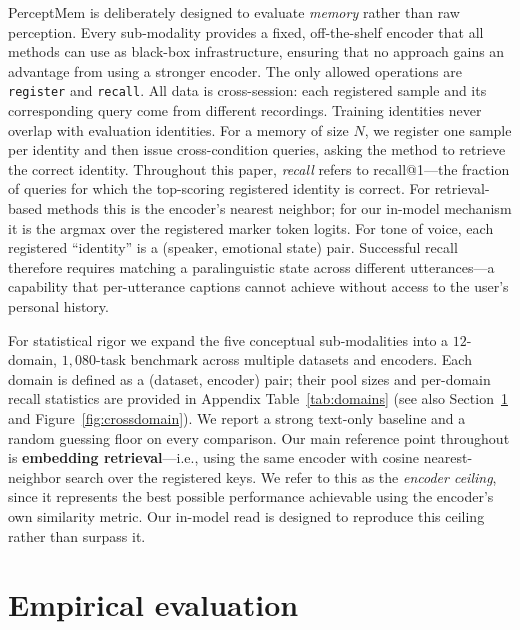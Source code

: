 PerceptMem is deliberately designed to evaluate \emph{memory} rather than raw perception. Every sub-modality provides a fixed, off-the-shelf encoder that all methods can use as black-box infrastructure, ensuring that no approach gains an advantage from using a stronger encoder. The only allowed operations are \texttt{register} and \texttt{recall}. All data is cross-session: each registered sample and its corresponding query come from different recordings. Training identities never overlap with evaluation identities. For a memory of size $N$, we register one sample per identity and then issue cross-condition queries, asking the method to retrieve the correct identity. Throughout this paper, \emph{recall} refers to recall@1---the fraction of queries for which the top-scoring registered identity is correct. For retrieval-based methods this is the encoder's nearest neighbor; for our in-model mechanism it is the argmax over the registered marker token logits. For tone of voice, each registered ``identity'' is a (speaker, emotional state) pair. Successful recall therefore requires matching a paralinguistic state across different utterances---a capability that per-utterance captions cannot achieve without access to the user's personal history.

For statistical rigor we expand the five conceptual sub-modalities into a $12$-domain, $1{,}080$-task benchmark across multiple datasets and encoders. Each domain is defined as a (dataset, encoder) pair; their pool sizes and per-domain recall statistics are provided in Appendix Table~\ref{tab:domains} (see also Section~\ref{sec:results} and Figure~\ref{fig:crossdomain}). We report a strong text-only baseline and a random guessing floor on every comparison. Our main reference point throughout is \textbf{embedding retrieval}---i.e., using the same encoder with cosine nearest-neighbor search over the registered keys. We refer to this as the \emph{encoder ceiling}, since it represents the best possible performance achievable using the encoder's own similarity metric. Our in-model read is designed to reproduce this ceiling rather than surpass it.


\section{Empirical evaluation}
\label{sec:results}

